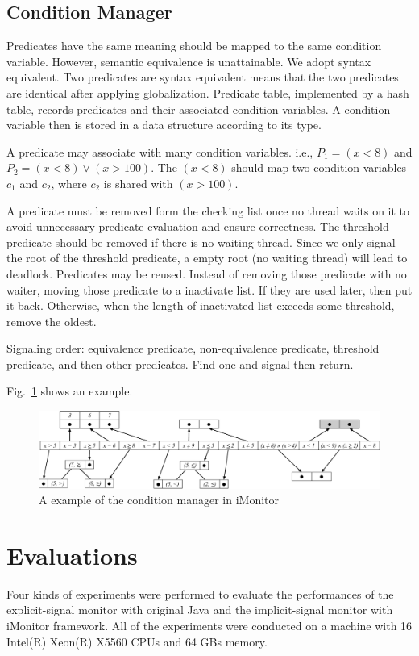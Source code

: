 \documentclass[preprint]{sigplanconf}
\begin{document}
\subsection{Condition Manager}
Predicates have the same meaning should be mapped to the same condition
variable. However, semantic equivalence is unattainable. We adopt syntax 
equivalent. Two predicates are syntax equivalent means that the two predicates
are identical after applying globalization. Predicate table, implemented by a
hash table, records predicates and their associated condition variables. A 
condition variable then is stored in a data structure according to its type.  

A predicate may associate with many condition variables. i.e., $P_1 = (x < 8)$
and $P_2 = (x < 8) \vee (x > 100)$. The $(x < 8)$ should map two condition
variables $c_1$ and $c_2$, where $c_2$ is shared with $(x > 100)$. 

A predicate must be removed form the checking list once no thread waits on 
it to avoid unnecessary predicate evaluation and ensure correctness. 
The threshold predicate should be removed if there is no waiting thread. Since 
we only signal the root of the threshold predicate, a empty root 
(no waiting thread) will lead to deadlock. Predicates may be reused. Instead of
removing those predicate with no waiter, moving those predicate to a inactivate
list. If they are used later, then put it back. Otherwise, when the length of 
inactivated list exceeds some threshold, remove the oldest.

Signaling order: equivalence predicate, non-equivalence predicate, threshold
predicate, and then other predicates. Find one and signal then return. 


Fig.~\ref{fig:mgr} shows an example. 
\begin{figure}[ht!]
  \centering
  \includegraphics[width=160mm]{fig/manager.eps}
  \caption{A example of the condition manager in iMonitor}
  \label{fig:mgr}
\end{figure}

\clearpage


\section{Evaluations} \label{sec:eval}
Four kinds of experiments were performed to evaluate the performances of the
explicit-signal monitor with original Java and the implicit-signal monitor with
iMonitor framework. All of the experiments were conducted on a machine with 16 
Intel(R) Xeon(R) X5560 CPUs and 64 GBs memory. 
\end{document}
